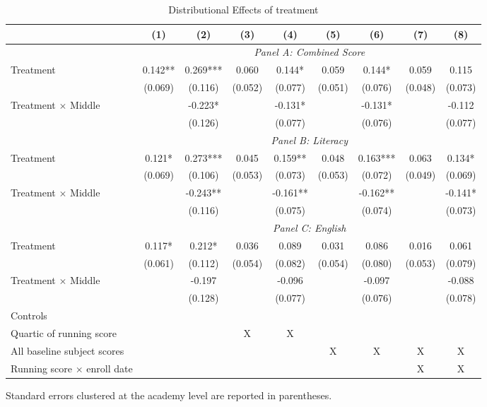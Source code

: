\begin{table}[htbp]
  \small
  \centering
  \caption{Distributional Effects of treatment}

  \begin{threeparttable}
    \begin{tabular}{lcccccccc}
    \toprule
    \toprule
          & (1)   & (2)   & (3)   & (4)   & (5)   & (6)   & (7)   & (8) \\
    \midrule
          & \multicolumn{8}{c}{\textit{Panel A: Combined Score}} \\
    Treatment & 0.142** & 0.269*** & 0.060 & 0.144* & 0.059 & 0.144* & 0.059 & 0.115 \\
          & (0.069) & (0.116) & (0.052) & (0.077) & (0.051) & (0.076) & (0.048) & (0.073) \\
    Treatment $\times$ Middle &       & -0.223* &       & -0.131* &       & -0.131* &       & -0.112 \\
          &       & (0.126) &       & (0.077) &       & (0.076) &       & (0.077) \\
          & \multicolumn{8}{c}{\textit{Panel B: Literacy}} \\
    Treatment & 0.121* & 0.273*** & 0.045 & 0.159** & 0.048 & 0.163*** & 0.063 & 0.134* \\
          & (0.069) & (0.106) & (0.053) & (0.073) & (0.053) & (0.072) & (0.049) & (0.069) \\
    Treatment $\times$ Middle &       & -0.243** &       & -0.161** &       & -0.162** &       & -0.141* \\
          &       & (0.116) &       & (0.075) &       & (0.074) &       & (0.073) \\
          & \multicolumn{8}{c}{\textit{Panel C: English}} \\
    Treatment & 0.117* & 0.212* & 0.036 & 0.089 & 0.031 & 0.086 & 0.016 & 0.061 \\
          & (0.061) & (0.112) & (0.054) & (0.082) & (0.054) & (0.080) & (0.053) & (0.079) \\
    Treatment $\times$ Middle &       & -0.197 &       & -0.096 &       & -0.097 &       & -0.088 \\
          &       & (0.128) &       & (0.077) &       & (0.076) &       & (0.078) \\
    \midrule
    Controls &       &       &       &       &       &       &       &  \\
    Quartic of running score &       &       & X     & X     &       &       &       &  \\
    All baseline subject scores &       &       &       &       & X     & X     & X     & X \\
    Running score $\times$ enroll date &       &       &       &       &       &       & X     & X \\
    \bottomrule
    \bottomrule
    \end{tabular}%
    \begin{tablenotes}
    \item Standard errors clustered at the academy level are reported in parentheses. 
    \end{tablenotes}
    

\end{threeparttable}
\end{table}
